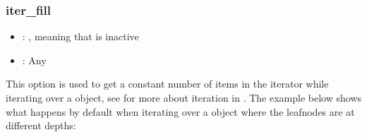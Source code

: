 \documentclass[a4paper,10pt,english]{sphinxmanual}
\begin{document}
\subsubsection{iter\_fill}
\label{\detokenize{README:iter-fill}}\begin{itemize}
\item {}
\sphinxAtStartPar
{}: , meaning that  is inactive

\item {}
\sphinxAtStartPar
{}: Any

\end{itemize}

\sphinxAtStartPar
This option is used to get a constant number of items in the iterator while iterating over a \sphinxhyphen{}object, see {\hyperref[\detokenize{README:iterating-over-nested-objects}]{}} for more about iteration in . The example below shows what happens by default when iterating over a \sphinxhyphen{}object where the leaf\sphinxhyphen{}nodes are at different depths:
\end{document}
